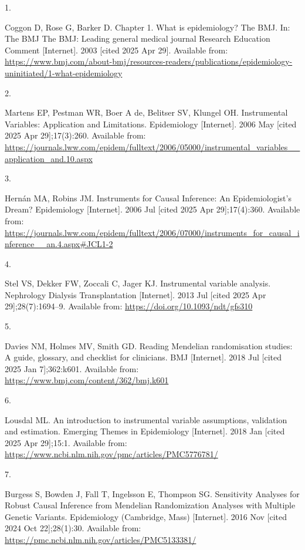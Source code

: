 \documentclass[
]{article}
\newlength{\cslhangindent}
\newlength{\csllabelwidth}
\newenvironment{CSLReferences}[2] %
 {\begin{list}{}{%
  \setlength{\itemindent}{0pt}
  \setlength{\leftmargin}{0pt}
  \setlength{\parsep}{0pt}
  \ifodd #1
   \setlength{\leftmargin}{\cslhangindent}
   \setlength{\itemindent}{-1\cslhangindent}
  \fi
  \setlength{\itemsep}{#2\baselineskip}}}
 {\end{list}}
\newcommand{\CSLLeftMargin}[1]{\parbox[t]{\csllabelwidth}{\strut#1\strut}}
\newcommand{\CSLRightInline}[1]{\parbox[t]{\linewidth - \csllabelwidth}{\strut#1\strut}}
\begin{document}
\label{refs}
\begin{CSLReferences}{0}{1}
\CSLLeftMargin{1. }%
\CSLRightInline{Coggon D, Rose G, Barker D. Chapter 1. {What} is epidemiology? {\textbar} {The} {BMJ}. In: The {BMJ} {\textbar} {The} {BMJ}: Leading general medical journal {Research} {Education} {Comment} {[}Internet{]}. 2003 {[}cited 2025 Apr 29{]}. Available from: \url{https://www.bmj.com/about-bmj/resources-readers/publications/epidemiology-uninitiated/1-what-epidemiology}}

\CSLLeftMargin{2. }%
\CSLRightInline{Martens EP, Pestman WR, Boer A de, Belitser SV, Klungel OH. Instrumental {Variables}: {Application} and {Limitations}. Epidemiology {[}Internet{]}. 2006 May {[}cited 2025 Apr 29{]};17(3):260. Available from: \url{https://journals.lww.com/epidem/fulltext/2006/05000/instrumental_variables__application_and.10.aspx}}

\CSLLeftMargin{3. }%
\CSLRightInline{Hernán MA, Robins JM. Instruments for {Causal} {Inference}: {An} {Epidemiologist}'s {Dream}? Epidemiology {[}Internet{]}. 2006 Jul {[}cited 2025 Apr 29{]};17(4):360. Available from: \url{https://journals.lww.com/epidem/fulltext/2006/07000/instruments_for_causal_inference__an.4.aspx\#JCL1-2}}

\CSLLeftMargin{4. }%
\CSLRightInline{Stel VS, Dekker FW, Zoccali C, Jager KJ. Instrumental variable analysis. Nephrology Dialysis Transplantation {[}Internet{]}. 2013 Jul {[}cited 2025 Apr 29{]};28(7):1694--9. Available from: \url{https://doi.org/10.1093/ndt/gfs310}}

\CSLLeftMargin{5. }%
\CSLRightInline{Davies NM, Holmes MV, Smith GD. Reading {Mendelian} randomisation studies: A guide, glossary, and checklist for clinicians. BMJ {[}Internet{]}. 2018 Jul {[}cited 2025 Jan 7{]};362:k601. Available from: \url{https://www.bmj.com/content/362/bmj.k601}}

\CSLLeftMargin{6. }%
\CSLRightInline{Lousdal ML. An introduction to instrumental variable assumptions, validation and estimation. Emerging Themes in Epidemiology {[}Internet{]}. 2018 Jan {[}cited 2025 Apr 29{]};15:1. Available from: \url{https://www.ncbi.nlm.nih.gov/pmc/articles/PMC5776781/}}

\CSLLeftMargin{7. }%
\CSLRightInline{Burgess S, Bowden J, Fall T, Ingelsson E, Thompson SG. Sensitivity {Analyses} for {Robust} {Causal} {Inference} from {Mendelian} {Randomization} {Analyses} with {Multiple} {Genetic} {Variants}. Epidemiology (Cambridge, Mass) {[}Internet{]}. 2016 Nov {[}cited 2024 Oct 22{]};28(1):30. Available from: \url{https://pmc.ncbi.nlm.nih.gov/articles/PMC5133381/}}


\end{CSLReferences}
\end{document}
